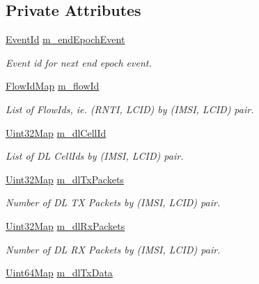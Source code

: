 \subsection*{Private Attributes}
\begin{DoxyCompactItemize}
\item 
\hyperlink{classns3_1_1EventId}{Event\+Id} \hyperlink{classns3_1_1MmWaveBearerStatsCalculator_aa981cec20869a554e813bd194efb5288}{m\+\_\+end\+Epoch\+Event}
\begin{DoxyCompactList}\small\item\em Event id for next end epoch event. \end{DoxyCompactList}\item 
\hyperlink{namespacens3_aab54007b3e014c13ffebdb845302cd83}{Flow\+Id\+Map} \hyperlink{classns3_1_1MmWaveBearerStatsCalculator_ac2cfada765e9b57387e6831ec6eef162}{m\+\_\+flow\+Id}
\begin{DoxyCompactList}\small\item\em List of Flow\+Ids, ie. (R\+N\+TI, L\+C\+ID) by (I\+M\+SI, L\+C\+ID) pair. \end{DoxyCompactList}\item 
\hyperlink{namespacens3_abfd8d9eba8902c110c885a991a0529cd}{Uint32\+Map} \hyperlink{classns3_1_1MmWaveBearerStatsCalculator_a2b8615e2f82d4c8be42854496b5279d5}{m\+\_\+dl\+Cell\+Id}
\begin{DoxyCompactList}\small\item\em List of DL Cell\+Ids by (I\+M\+SI, L\+C\+ID) pair. \end{DoxyCompactList}\item 
\hyperlink{namespacens3_abfd8d9eba8902c110c885a991a0529cd}{Uint32\+Map} \hyperlink{classns3_1_1MmWaveBearerStatsCalculator_a37b485984dd42a821245655ae8954271}{m\+\_\+dl\+Tx\+Packets}
\begin{DoxyCompactList}\small\item\em Number of DL TX Packets by (I\+M\+SI, L\+C\+ID) pair. \end{DoxyCompactList}\item 
\hyperlink{namespacens3_abfd8d9eba8902c110c885a991a0529cd}{Uint32\+Map} \hyperlink{classns3_1_1MmWaveBearerStatsCalculator_a27b11e5f800578a90f553bb1066269bb}{m\+\_\+dl\+Rx\+Packets}
\begin{DoxyCompactList}\small\item\em Number of DL RX Packets by (I\+M\+SI, L\+C\+ID) pair. \end{DoxyCompactList}\item 
\hyperlink{namespacens3_a02246d7bb546e26a989e837a36d17797}{Uint64\+Map} \hyperlink{classns3_1_1MmWaveBearerStatsCalculator_a00890b1dc66fb1b4fbd106a4fe4cda53}{m\+\_\+dl\+Tx\+Data}

\end{DoxyCompactItemize}
